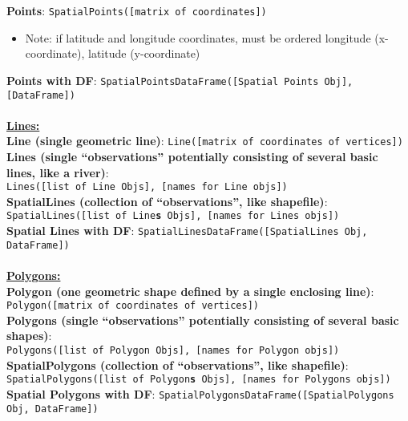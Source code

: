 \documentclass[10pt]{article}
\begin{document}
\textbf{Points}: \texttt{SpatialPoints([matrix of coordinates])}
\begin{itemize}
	\item Note: if latitude and longitude coordinates, must be ordered longitude (x-coordinate), latitude (y-coordinate)
\end{itemize}
\textbf{Points with DF}: \texttt{SpatialPointsDataFrame([Spatial Points Obj], [DataFrame])}\\
\\
\underline{\textbf{Lines:}}\\

\textbf{Line (single geometric line)}: \texttt{Line([matrix of coordinates of vertices])}\\
\textbf{Lines (single ``observations'' potentially consisting of several basic lines, like a river)}:\\ 
\hspace*{1cm} \texttt{Lines([list of Line Objs], [names for Line objs])}\\
\textbf{SpatialLines (collection of ``observations'', like shapefile)}: \\
\hspace*{1cm} \texttt{SpatialLines([list of Line\textbf{s} Objs], [names for Lines objs])}\\
\textbf{Spatial Lines with DF}: \texttt{SpatialLinesDataFrame([SpatialLines Obj, DataFrame])}\\
\\
\underline{\textbf{Polygons:}} \\

\textbf{Polygon (one geometric shape defined by a single enclosing line)}: \\
\hspace*{1cm}\texttt{Polygon([matrix of coordinates of vertices])} \\
\textbf{Polygons (single ``observations'' potentially consisting of several basic shapes)}:\\ 
\hspace*{1cm} \texttt{Polygons([list of Polygon Objs], [names for Polygon objs])}\\
\textbf{SpatialPolygons (collection of ``observations'', like shapefile)}:\\
\hspace*{1cm} \texttt{SpatialPolygons([list of Polygon\textbf{s} Objs], [names for Polygons objs])}\\
\textbf{Spatial Polygons with DF}: \texttt{SpatialPolygonsDataFrame([SpatialPolygons Obj, DataFrame])}
\end{document}
